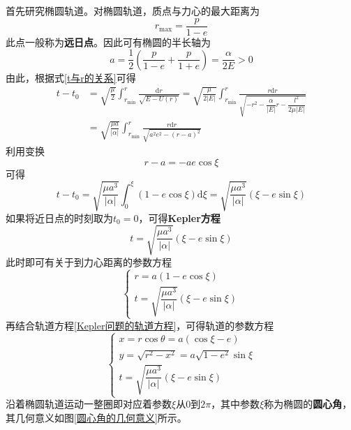 首先研究椭圆轨道。对椭圆轨道，质点与力心的最大距离为
\begin{equation*}
	r_{\max} = \frac{p}{1-e}
\end{equation*}
此点一般称为{\bf 远日点}。因此可有椭圆的半长轴为
\begin{equation*}
	a = \frac12 \left(\frac{p}{1-e}+\frac{p}{1+e}\right) = \frac{\alpha}{2E} > 0
\end{equation*}
由此，根据式\eqref{t与r的关系}可得
\begin{align*}
	t-t_0 & = \sqrt{\frac{\mu}{2}} \int_{r_{\min}}^r \frac{\mathrm{d}r}{\sqrt{E-U(r)}} = \sqrt{\frac{\mu}{2|E|}} \int_{r_{\min}}^r \frac{r\mathrm{d}r}{\sqrt{-r^2-\dfrac{\alpha}{|E|}r-\dfrac{l^2}{2\mu|E|}}} \\
	& = \sqrt{\frac{\mu a}{|\alpha|}} \int_{r_{\min}}^r \frac{r\mathrm{d}r}{\sqrt{a^2e^2-(r-a)^2}}
\end{align*}
利用变换
\begin{equation*}
	r-a = -ae\cos \xi
\end{equation*}
可得
\begin{equation*}
	t-t_0 = \sqrt{\frac{\mu a^3}{|\alpha|}} \int_0^\xi (1-e\cos\xi) \mathrm{d}\xi = \sqrt{\frac{\mu a^3}{|\alpha|}} (\xi-e\sin \xi)
\end{equation*}
如果将近日点的时刻取为$t_0=0$，可得{\bf Kepler方程}
\begin{equation}
	t = \sqrt{\frac{\mu a^3}{|\alpha|}} (\xi-e\sin \xi)
	\label{Kepler方程}
\end{equation}
此时即可有关于到力心距离的参数方程
\begin{equation}
\begin{cases}
	r=a(1-e\cos \xi) \\
	t = \sqrt{\dfrac{\mu a^3}{|\alpha|}} (\xi-e\sin \xi)
\end{cases}
\end{equation}
再结合轨道方程\eqref{Kepler问题的轨道方程}，可得轨道的参数方程
\begin{equation}
\begin{cases}
	x = r\cos \theta = a(\cos \xi-e) \\
	y = \sqrt{r^2-x^2} = a\sqrt{1-e^2}\sin \xi \\
	t = \sqrt{\dfrac{\mu a^3}{|\alpha|}} (\xi-e\sin \xi)
\end{cases}
\end{equation}
沿着椭圆轨道运动一整圈即对应着参数$\xi$从$0$到$2\pi$，其中参数$\xi$称为椭圆的{\bf 圆心角}，其几何意义如图\ref{圆心角的几何意义}所示。

